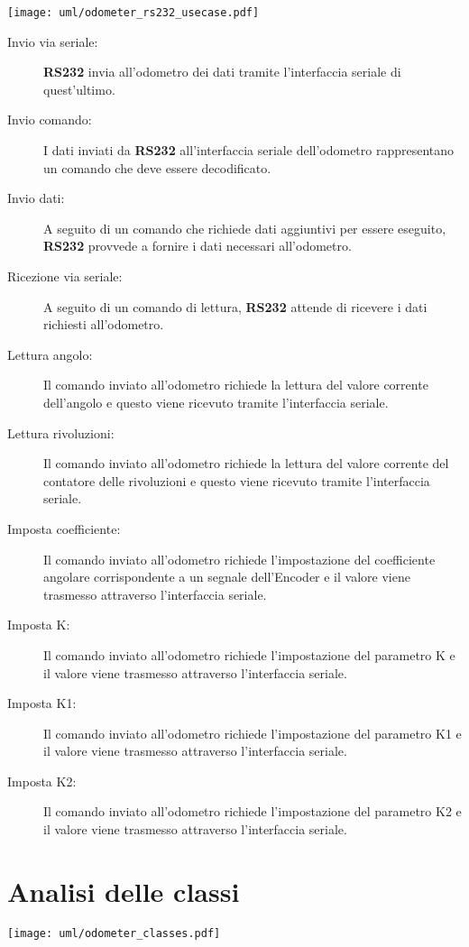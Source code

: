 \documentclass [11pt,a4paper,oneside]{paper}
\newcommand{\actor}[1]{\textbf{#1}}
\begin{document}
\begin{center}
    \texttt{[image: uml/odometer\_rs232\_usecase.pdf]}
    \label{rs232_usecase}
\end{center}

\begin{description}
\item[Invio via seriale:] \actor{RS232} invia all'odometro dei dati tramite l'interfaccia
     seriale di quest'ultimo.
\item[Invio comando:] I dati inviati da \actor{RS232} all'interfaccia seriale dell'odometro
     rappresentano un comando che deve essere decodificato.
\item[Invio dati:] A seguito di un comando che richiede dati aggiuntivi per essere
     eseguito, \actor{RS232} provvede a fornire i dati necessari all'odometro.
\item[Ricezione via seriale:] A seguito di un comando di lettura, \actor{RS232} attende di
     ricevere i dati richiesti all'odometro.
\item[Lettura angolo:] Il comando inviato all'odometro richiede la lettura del
     valore corrente dell'angolo e questo viene ricevuto tramite l'interfaccia
     seriale.
\item[Lettura rivoluzioni:] Il comando inviato all'odometro richiede la lettura del
     valore corrente del contatore delle rivoluzioni e questo viene ricevuto
     tramite l'interfaccia seriale.
\item[Imposta coefficiente:] Il comando inviato all'odometro richiede l'impostazione
     del coefficiente angolare corrispondente a un segnale dell'Encoder e il valore
     viene trasmesso attraverso l'interfaccia seriale.
\item[Imposta K:] Il comando inviato all'odometro richiede l'impostazione del
     parametro K e il valore viene trasmesso attraverso l'interfaccia seriale.
\item[Imposta K1:] Il comando inviato all'odometro richiede l'impostazione del
     parametro K1 e il valore viene trasmesso attraverso l'interfaccia seriale.
\item[Imposta K2:] Il comando inviato all'odometro richiede l'impostazione del
     parametro K2 e il valore viene trasmesso attraverso l'interfaccia seriale.
\end{description}


\section{Analisi delle classi}
\begin{center}
    \texttt{[image: uml/odometer\_classes.pdf]}
    \label{usecases}
\end{center}
\end{document}

